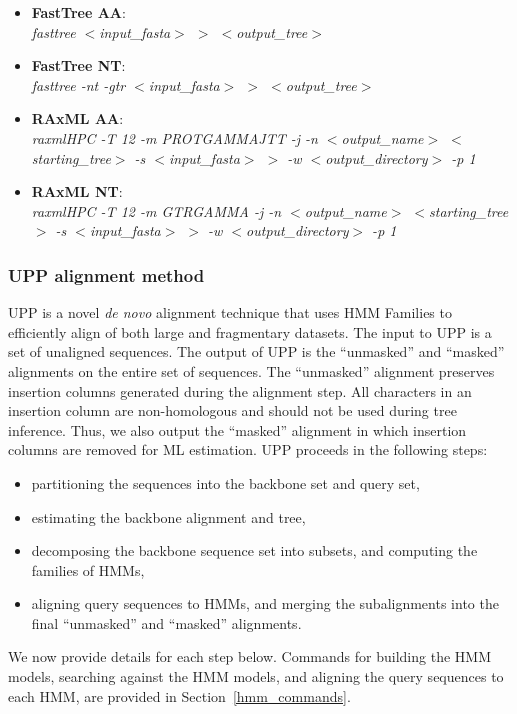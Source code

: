 \begin{itemize}
\item \textbf{FastTree AA}:\\\emph{fasttree $<$input\_fasta$>$ $>$ $<$output\_tree$>$}
\item \textbf{FastTree NT}:\\\emph{fasttree -nt -gtr $<$input\_fasta$>$ $>$ $<$output\_tree$>$}
\item \textbf{RAxML AA}:\\\emph{raxmlHPC -T 12 -m PROTGAMMAJTT -j -n $<$output\_name$>$ $<$starting\_tree$>$ -s $<$input\_fasta$>$ $>$ -w $<$output\_directory$>$ -p 1}
\item \textbf{RAxML NT}:\\\emph{raxmlHPC -T 12 -m GTRGAMMA -j -n $<$output\_name$>$ $<$starting\_tree$>$ -s $<$input\_fasta$>$ $>$ -w $<$output\_directory$>$ -p 1}
\end{itemize}

\subsubsection{UPP alignment method} \label{upp_alg}
UPP is a novel \emph{de novo} alignment technique that uses HMM Families to efficiently align of both large and fragmentary datasets.  The input to UPP is a set of unaligned sequences.  The output of UPP is the ``unmasked'' and ``masked'' alignments on the entire set of sequences.  The ``unmasked'' alignment preserves insertion columns generated during the alignment step.  All characters in an insertion column are non-homologous and should not be used during tree inference.  Thus, we also output the ``masked'' alignment in which insertion columns are removed for ML estimation.  UPP proceeds in the following steps:
\begin{itemize}
\item partitioning the sequences into the backbone set and query set,
\item estimating the backbone alignment and tree,
\item decomposing the backbone sequence
set into subsets, and computing the families of HMMs,
\item aligning query sequences to HMMs, and merging the subalignments into
the final ``unmasked'' and ``masked'' alignments.
\end{itemize}

We now provide details for each step below.  Commands for building the HMM models, 
searching against the HMM models, and aligning the query sequences 
to each HMM, are provided in Section~\ref{hmm_commands}.

